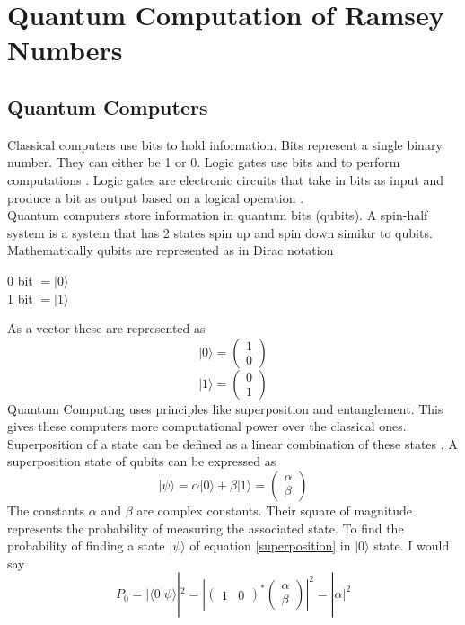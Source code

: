 \documentclass{Assignment}
\begin{document}
\section{Quantum Computation of Ramsey Numbers}
\subsection{Quantum Computers}



Classical computers use bits to hold information.
Bits represent a single binary number.
They can either be 1 or 0.
Logic gates use bits and to perform computations \cite{deutsch1985quantum}.
Logic gates are electronic circuits that take in bits as input and produce a bit as output based on a logical operation \cite{Jaeger1997}.\\
Quantum computers store information in quantum bits (qubits).
A spin-half system is a system that has 2 states spin up and spin down similar to qubits.
Mathematically qubits are represented  as in Dirac notation \begin{center}
	0 bit $=|0\rangle $ \\1 bit $=  |1\rangle$
\end{center}
As a vector these are represented as 
$$|0\rangle = \begin{pmatrix}
	1\\0
\end{pmatrix}$$
$$|1\rangle = \begin{pmatrix}
	0\\1
\end{pmatrix}$$
Quantum Computing uses principles like superposition and entanglement.
This gives these computers more computational power over the classical ones.
Superposition of a state can be defined as a linear combination of these states \cite{mcintyre_quantum_2012}.
A superposition state of qubits can be expressed as \begin{equation}
	|\psi\rangle = \alpha|0\rangle + \beta|1\rangle = \begin{pmatrix}
		\alpha\\\beta
		\label{superposition}
\end{pmatrix} \end{equation}
The constants $\alpha $ and $ \beta$ are complex constants.
Their square of magnitude represents the probability of measuring the associated state.
To find the probability of finding a state $|\psi\rangle$ of equation \eqref{superposition} in $|0\rangle$ state.
I would say
$$P_0=|\langle0|\psi\rangle|^2 = \left| \begin{pmatrix}
	1&0
\end{pmatrix}^*\begin{pmatrix}
	\alpha\\\beta
\end{pmatrix} \right|^2 = |\alpha|^2$$
\end{document}
